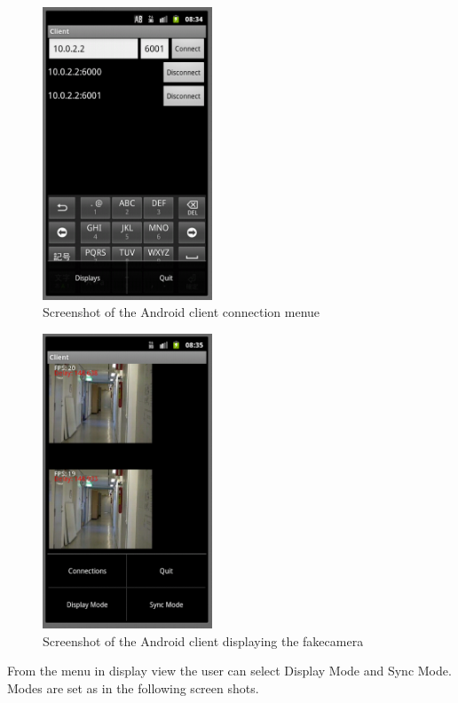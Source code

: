 \documentclass[8pt,titlepage]{article}
\begin{document}
\begin{figure}[hbp]
\includegraphics[width=0.45\textwidth]{../screenshots/androidConnecting.png}
\caption{Screenshot of the Android client connection menue}
\end{figure}


\begin{figure}[hbp]
\includegraphics[width=0.45\textwidth]{../screenshots/androidDisplaying.png}
\caption{Screenshot of the Android client displaying the fakecamera}
\end{figure}

From the menu in display view the user can select Display Mode and Sync Mode. Modes are set as in the following screen shots.
\end{document}
